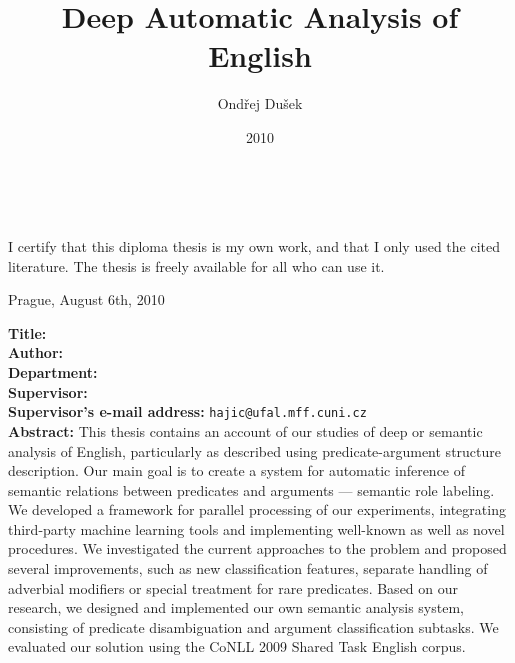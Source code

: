 \documentclass[12pt,notitlepage]{report}
\title{Deep Automatic Analysis of English}
\author{Ondřej Dušek}
\date{2010}
\def\fulldate{August 6th, 2010}
\begin{document}
\maketitle

\pagestyle{plain}
\normalsize %
\setcounter{page}{2} %
\cleardoublepage
\ \vspace{10mm} 

\noindent %
 
\vspace{\fill}
\noindent I certify that this diploma thesis is my own work, and that I only used the cited literature. The thesis is freely available for all who can use it.

 
\bigskip
\noindent Prague, \fulldate \hspace{\fill}\theauthor\\ %


\cleardoublepage
\tableofcontents %

\cleardoublepage %
\pagestyle{plain}
\noindent
\textbf{Title:} \thetitle\\
\textbf{Author:} \theauthor\\
\textbf{Department:} \thedept\\
\textbf{Supervisor:} \thesupervisor\\
\textbf{Supervisor's e-mail address:} \texttt{hajic@ufal.mff.cuni.cz}\\

\noindent \textbf{Abstract:} This thesis contains an account of our studies of deep or semantic analysis of English, particularly as described using predicate-argument structure description. Our main goal is to create a system for automatic inference of semantic relations between predicates and arguments --- semantic role labeling. We developed a framework for parallel processing of our experiments, integrating third-party machine learning tools and implementing well-known as well as novel procedures. We investigated the current approaches to the problem and proposed several improvements, such as new classification features, separate handling of adverbial modifiers or special treatment for rare predicates. Based on our research, we designed and implemented our own semantic analysis system, consisting of predicate disambiguation and argument classification subtasks. We evaluated our solution using the CoNLL 2009 Shared Task English corpus. \\
\end{document}

